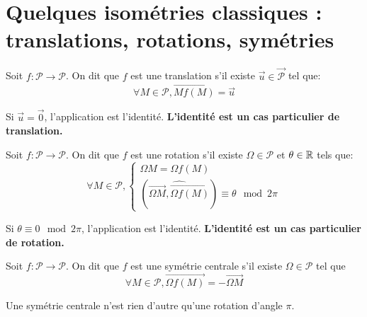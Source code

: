 \section{Quelques isométries classiques : translations, rotations, symétries}

\begin{definition}
Soit $f : \mathcal P\to \mathcal P$. On dit que $f$ est une translation s'il existe $\overrightarrow{u} \in \overrightarrow{\mathcal P}$ tel que:
\[ \forall M \in\mathcal P, \overrightarrow{Mf(M)} = \overrightarrow u\]
\end{definition}

\begin{remarque}
Si $\overrightarrow u=\overrightarrow 0$, l'application est l'identité. \textbf{L'identité est un cas particulier de translation.}
\end{remarque}


\begin{definition}
Soit $f : \mathcal P\to \mathcal P$. On dit que $f$ est une rotation s'il existe $\Omega\in\mathcal P$ et $\theta\in\mathbb{R}$ tels que:
\[ 
\forall M\in\mathcal P, 
\begin{cases}
\Omega M = \Omega f(M)\\
(\widehat{\overrightarrow{\Omega M},\overrightarrow{\Omega f(M)}})\equiv \theta \mod 2\pi
\end{cases}
\]
\end{definition}


\begin{remarque}
Si $\theta\equiv 0 \mod 2\pi$, l'application est l'identité. \textbf{L'identité est un cas particulier de rotation.}
\end{remarque}

\begin{definition}
Soit $f : \mathcal P\to \mathcal P$. On dit que $f$ est une symétrie centrale s'il existe $\Omega\in\mathcal P$ tel que
\[ \forall M\in\mathcal P, \overrightarrow{\Omega f(M)}=-\overrightarrow{\Omega M}\]
\end{definition}

\begin{remarque}
Une symétrie centrale n'est rien d'autre qu'une rotation d'angle $\pi$.
\end{remarque}


